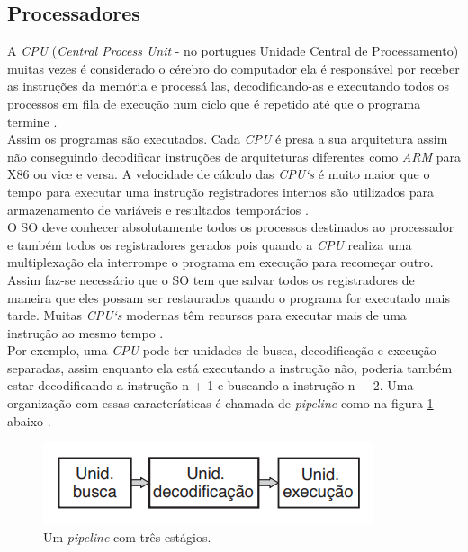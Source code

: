 \subsection{Processadores}
A \emph{CPU} (\emph{Central Process Unit} -  no portugues Unidade Central de Processamento) muitas vezes é considerado o cérebro do computador ela é responsável por receber as instruções da memória e processá las, decodificando-as e executando todos os processos em fila de execução num ciclo que é repetido até que o programa termine \cite{Tanenbaum2016}. \\
Assim os programas são executados. Cada \emph{CPU} é presa a sua arquitetura assim não conseguindo decodificar instruções de arquiteturas diferentes como \emph{ARM} para X86 ou vice e versa. A velocidade de cálculo das \emph{CPU`s} é muito maior que o tempo para executar uma instrução registradores internos são utilizados para armazenamento de variáveis e resultados temporários \cite{Tanenbaum2016}.\\
O SO deve conhecer absolutamente todos os processos destinados ao processador e também todos os registradores gerados pois quando a \emph{CPU} realiza uma multiplexação ela interrompe o programa em execução para recomeçar outro. Assim faz-se necessário que o SO tem que salvar todos os registradores de maneira que eles possam ser restaurados quando o programa for executado mais tarde. Muitas \emph{CPU`s} modernas têm recursos para executar mais de uma instrução ao mesmo tempo \cite{Tanenbaum2016}. \\
Por exemplo, uma \emph{CPU} pode ter unidades de busca, decodificação e execução separadas, assim enquanto ela está executando a instrução não, poderia também estar decodificando a instrução n + 1 e buscando a instrução n + 2. Uma organização com essas características é chamada de \emph{pipeline} como na figura \ref{fig:Processador1} abaixo \cite{Tanenbaum2016}.\\
\begin{figure}[htpb]
    \centering
   \includegraphics[scale=1]{imagens/Processador1.png}
   \caption{Um \emph{pipeline} com três estágios. \cite{Tanenbaum2016}}
   \label{fig:Processador1}
\end{figure}\\

